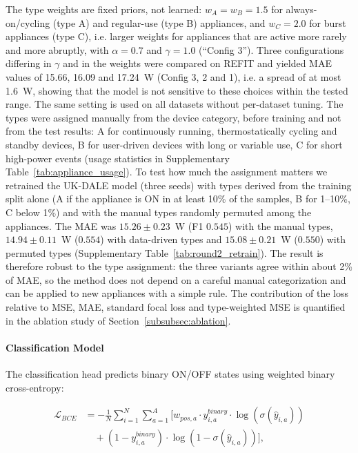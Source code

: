 \documentclass[fleqn,10pt]{wlscirep}
\begin{document}
The type weights are fixed priors, not learned: $w_A=w_B=1.5$ for always-on/cycling (type A) and regular-use (type B) appliances, and $w_C=2.0$ for burst appliances (type C), i.e. larger weights for appliances that are active more rarely and more abruptly, with $\alpha=0.7$ and $\gamma=1.0$ (``Config 3''). Three configurations differing in $\gamma$ and in the weights were compared on REFIT and yielded MAE values of 15.66, 16.09 and 17.24~W (Config 3, 2 and 1), i.e. a spread of at most 1.6~W, showing that the model is not sensitive to these choices within the tested range. The same setting is used on all datasets without per-dataset tuning. The types were assigned manually from the device category, before training and not from the test results: A for continuously running, thermostatically cycling and standby devices, B for user-driven devices with long or variable use, C for short high-power events (usage statistics in Supplementary Table~\ref{tab:appliance_usage}). To test how much the assignment matters we retrained the UK-DALE model (three seeds) with types derived from the training split alone (A if the appliance is ON in at least 10\% of the samples, B for 1--10\%, C below 1\%) and with the manual types randomly permuted among the appliances. The MAE was $15.26\pm0.23$~W (F1 $0.545$) with the manual types, $14.94\pm0.11$~W ($0.554$) with data-driven types and $15.08\pm0.21$~W ($0.550$) with permuted types (Supplementary Table~\ref{tab:round2_retrain}). The result is therefore robust to the type assignment: the three variants agree within about 2\% of MAE, so the method does not depend on a careful manual categorization and can be applied to new appliances with a simple rule. The contribution of the loss relative to MSE, MAE, standard focal loss and type-weighted MSE is quantified in the ablation study of Section~\ref{subsubsec:ablation}.

\paragraph{Classification Model} The classification head predicts binary ON/OFF states using weighted binary cross-entropy:

\begin{equation}
\label{eq:bce_loss}
\begin{split}
\mathcal{L}_{BCE} &= -\frac{1}{N} \sum_{i=1}^{N} \sum_{a=1}^{A} \Big[ w_{pos,a} \cdot y_{i,a}^{binary} \cdot \log(\sigma(\hat{y}_{i,a})) \\
&\quad + (1 - y_{i,a}^{binary}) \cdot \log(1 - \sigma(\hat{y}_{i,a})) \Big],
\end{split}
\end{equation}
\end{document}
